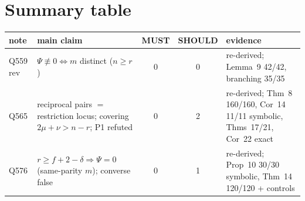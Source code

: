 \documentclass[11pt]{amsart}
\begin{document}
\section*{Summary table}
\begin{center}\small
\begin{tabular}{@{}p{1.6cm}p{4.6cm}ccp{5.2cm}@{}}
\toprule
note & main claim & MUST & SHOULD & evidence\\
\midrule
Q559 rev & $\Psi\not\equiv0\iff m$ distinct ($n\ge r$) & 0 & 0 & re-derived; Lemma~9 42/42, branching 35/35\\
Q565 & reciprocal pairs $=$ restriction locus; covering $2\mu+\nu>n-r$; P1 refuted & 0 & 2 & re-derived; Thm~8 160/160, Cor~14 11/11 symbolic, Thms~17/21, Cor~22 exact\\
Q576 & $r\ge f+2-\delta\Rightarrow\Psi=0$ (same-parity $m$); converse false & 0 & 1 & re-derived; Prop~10 30/30 symbolic, Thm~14 120/120 + controls\\
\bottomrule
\end{tabular}
\end{center}
\end{document}

